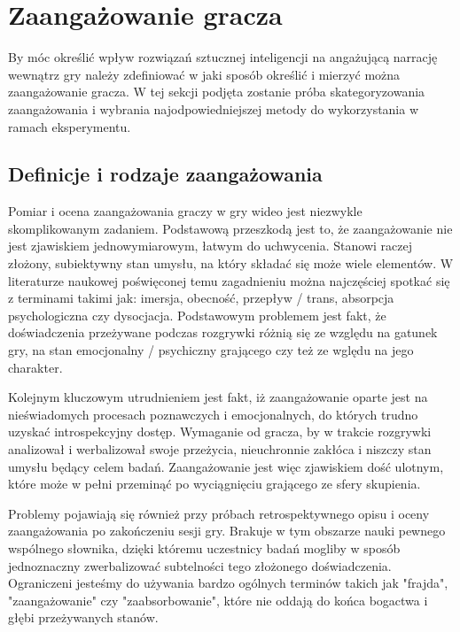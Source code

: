 \graphicspath{{chapters/chapter3/imgs/}}

\chapter{Zaangażowanie gracza}\label{chapter:ch3}

By móc określić wpływ rozwiązań sztucznej inteligencji na angażującą narrację wewnątrz gry należy
zdefiniować w jaki sposób określić i mierzyć można zaangażowanie gracza. W tej sekcji podjęta
zostanie próba skategoryzowania zaangażowania i wybrania najodpowiedniejszej metody do wykorzystania
w ramach eksperymentu.

\section{Definicje i rodzaje zaangażowania}\label{section:ch3_1}

Pomiar i ocena zaangażowania graczy w gry wideo jest niezwykle skomplikowanym zadaniem.
Podstawową przeszkodą jest to, że zaangażowanie nie jest zjawiskiem jednowymiarowym\cite{eng_in_games}, łatwym do
uchwycenia\cite{measuring_user_exp}. Stanowi raczej złożony, subiektywny stan umysłu, na który składać się
może wiele elementów. W literaturze naukowej poświęconej temu zagadnieniu można najczęściej spotkać się z terminami
takimi jak: imersja, obecność, przepływ / trans, absorpcja psychologiczna czy dysocjacja. Podstawowym problemem
jest fakt, że doświadczenia przeżywane podczas rozgrywki różnią się ze względu na gatunek gry, na stan
emocjonalny / psychiczny grającego czy też ze wględu na jego charakter\cite{measuring_user_exp}.

Kolejnym kluczowym utrudnieniem jest fakt, iż zaangażowanie oparte jest na
nieświadomych procesach poznawczych i emocjonalnych, do których trudno uzyskać
introspekcyjny dostęp\cite{measuring_user_exp}. Wymaganie od gracza, by w trakcie rozgrywki analizował i werbalizował swoje
przeżycia, nieuchronnie zakłóca i niszczy stan umysłu będący celem badań.
Zaangażowanie jest więc zjawiskiem dość ulotnym, które może w pełni przeminąć po wyciągnięciu grającego
ze sfery skupienia\cite{measuring_user_exp}.

Problemy pojawiają się również przy próbach retrospektywnego opisu i oceny zaangażowania po zakończeniu
sesji gry. Brakuje w tym obszarze nauki pewnego wspólnego słownika, dzięki któremu uczestnicy badań mogliby
w sposób jednoznaczny zwerbalizować subtelności tego złożonego doświadczenia\cite{measuring_user_exp}.
Ograniczeni jesteśmy do używania bardzo ogólnych terminów takich jak "frajda",
"zaangażowanie" czy "zaabsorbowanie", które nie oddają do końca bogactwa i głębi przeżywanych
stanów\cite{measuring_user_exp}.


